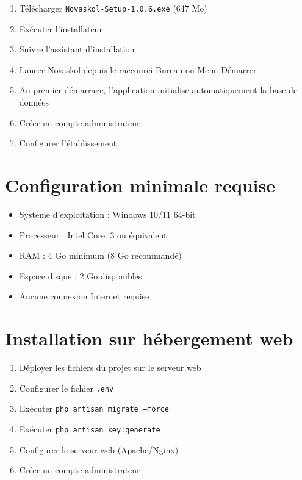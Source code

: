 \documentclass[12pt,a4paper,twoside]{report}
\begin{document}
\begin{enumerate}
    \item Télécharger \texttt{Novaskol-Setup-1.0.6.exe} (647 Mo)
    \item Exécuter l'installateur
    \item Suivre l'assistant d'installation
    \item Lancer Novaskol depuis le raccourci Bureau ou Menu Démarrer
    \item Au premier démarrage, l'application initialise automatiquement la base de données
    \item Créer un compte administrateur
    \item Configurer l'établissement
\end{enumerate}

\section{Configuration minimale requise}

\begin{itemize}
    \item Système d'exploitation : Windows 10/11 64-bit
    \item Processeur : Intel Core i3 ou équivalent
    \item RAM : 4 Go minimum (8 Go recommandé)
    \item Espace disque : 2 Go disponibles
    \item Aucune connexion Internet requise
\end{itemize}

\section{Installation sur hébergement web}

\begin{enumerate}
    \item Déployer les fichiers du projet sur le serveur web
    \item Configurer le fichier \texttt{.env}
    \item Exécuter \texttt{php artisan migrate --force}
    \item Exécuter \texttt{php artisan key:generate}
    \item Configurer le serveur web (Apache/Nginx)
    \item Créer un compte administrateur
\end{enumerate}

\end{document}
